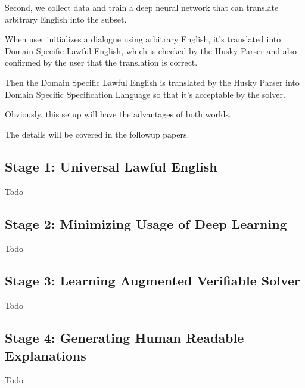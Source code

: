 \documentclass[9pt, oneside]{article}   	%
\theoremstyle{definition}
\begin{document}
Second, we collect data and train a deep neural network that can translate arbitrary English into the subset.

When user initializes a dialogue using arbitrary English, it's translated into Domain Specific Lawful English, which is checked by the Husky Parser and also confirmed by the user that the translation is correct.

Then the Domain Specific Lawful English is translated by the Husky Parser into Domain Specific Specification Language so that it's acceptable by the solver.

Obviously, this setup will have the advantages of both worlds.

The details will be covered in the followup papers.

\subsection{Stage 1: Universal Lawful English}

Todo

\subsection{Stage 2: Minimizing Usage of Deep Learning}

Todo

\subsection{Stage 3: Learning Augmented Verifiable Solver}

Todo

\subsection{Stage 4: Generating Human Readable Explanations}

Todo
\end{document}
